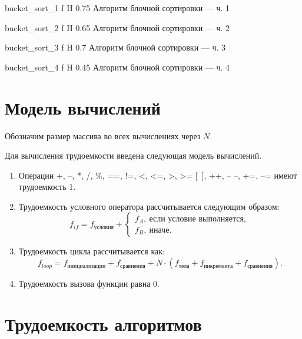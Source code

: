     {bucket_sort_1}
    {f}
    {H}
    {0.75\textwidth}
    {Алгоритм блочной сортировки --- ч. 1}
    
    {bucket_sort_2}
    {f}
    {H}
    {0.65\textwidth}
    {Алгоритм блочной сортировки --- ч. 2}
    
    {bucket_sort_3}
    {f}
    {H}
    {0.7\textwidth}
    {Алгоритм блочной сортировки --- ч. 3}
    
    {bucket_sort_4}
    {f}
    {H}
    {0.45\textwidth}
    {Алгоритм блочной сортировки --- ч. 4}  

\section{Модель вычислений}

Обозначим размер массива во всех вычислениях через $N$.

Для вычисления трудоемкости введена следующая модель вычислений.

\begin{enumerate}
\item
Операции +, --, *, /, \%, ==, !=, <, <=, >, >= [~], ++, -- --, +=, --= имеют трудоемкость 1.

\item
Трудоемкость условного оператора рассчитывается следующим образом:
\begin{equation}
f_{if} = f_{\text{условия}} +
	\begin{cases}
    f_A,~\text{если условие выполняется}, \\
    f_B,~\text{иначе}.
    \end{cases}
\end{equation}

\item
Трудоемкость цикла рассчитывается как:
\begin{equation}
f_{loop} = f_{\text{инициализации}} + f_{\text{сравнения}} + N \cdot (f_{\text{тела}} + f_{\text{инкремента}} +  f_{\text{сравнения}}).
\end{equation}

\item
Трудоемкость вызова функции равна 0.
\end{enumerate}

\section{Трудоемкость алгоритмов}

